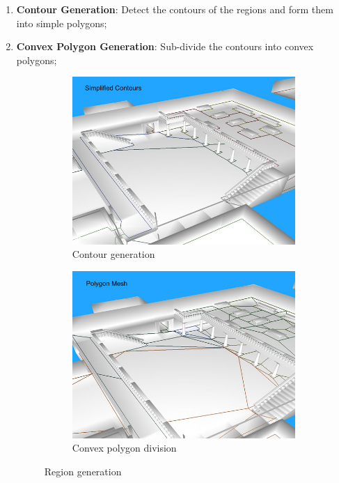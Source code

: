 \begin{enumerate}
  \item\textbf{Contour Generation}: Detect the contours of the regions and form them into simple polygons;

  
  \item\textbf{Convex Polygon Generation}:  Sub-divide the contours into convex polygons;
  
  \begin{figure}[H]
        \centering
        \begin{subfigure}[b]{0.48\textwidth}
                \centering
                \includegraphics[width=\textwidth]{../images/cont_11_simplified_full.png}
                \caption{Contour generation}
        \end{subfigure}
        \begin{subfigure}[b]{0.48\textwidth}
                \centering
                \includegraphics[width=\textwidth]{../images/stage_polygon_mesh.png}
                \caption{Convex polygon division}
        \end{subfigure}
        \caption{Region generation}
	\end{figure}   
  

\end{enumerate}
